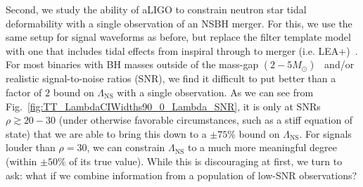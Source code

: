 \documentclass[aps,prd,amsmath,floats,floatfix, twocolumn,
superscriptaddress,nofootinbib,showpacs]{revtex4-1}
\newcommand{\prayush}{\textcolor{red!40!black}}
\newcommand{\lambdans}{\Lambda_\mathrm{NS}}
\begin{document}
Second, we study the ability of aLIGO to constrain neutron star tidal 
deformability with a single observation of an NSBH merger. For this, we
use the same setup for signal waveforms as before, but replace the filter
template model with one that includes tidal effects from inspiral
through to merger (i.e. LEA+)~\cite{Lackey:2013axa}. For most binaries with
BH masses outside of the mass-gap $(2-5M_\odot)$~\cite{Bailyn:1997xt,
Kalogera:1996ci,Kreidberg:2012,Littenberg:2015tpa} and/or realistic signal-to-noise
ratios (SNR), we find it difficult to put better than a factor of $2$ bound
on $\lambdans$ with a single observation. As we can see from
Fig.~\ref{fig:TT_LambdaCIWidths90_0_Lambda_SNR}, it is only at SNRs 
$\rho\gtrsim 20-30$ (under otherwise favorable circumstances, such as a stiff
equation of state) that we are able
to bring this down to a $\pm 75\%$ bound on $\lambdans$. For signals louder
than $\rho =30$, we can constrain $\lambdans$ to a much more meaningful degree
(within $\pm 50\%$ of its true value).
While this is discouraging at first, we turn to ask: what if we combine
information from a population of low-SNR observations?
\end{document}
